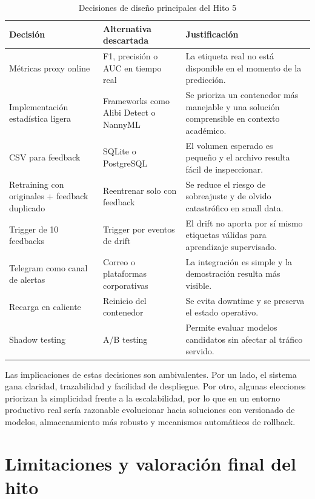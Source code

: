 \begin{table}[h]
\centering
\caption{Decisiones de diseño principales del Hito 5}
\vspace{0.2cm}

\renewcommand{\arraystretch}{1.25}

\begin{tabular}{p{3.5cm} p{4cm} p{6.2cm}}
\hline
\textbf{Decisión} & \textbf{Alternativa descartada} & \textbf{Justificación} \\
\hline
Métricas proxy online & F1, precisión o AUC en tiempo real & La etiqueta real no está disponible en el momento de la predicción. \\
Implementación estadística ligera & Frameworks como Alibi Detect o NannyML & Se prioriza un contenedor más manejable y una solución comprensible en contexto académico. \\
CSV para feedback & SQLite o PostgreSQL & El volumen esperado es pequeño y el archivo resulta fácil de inspeccionar. \\
Retraining con originales + feedback duplicado & Reentrenar solo con feedback & Se reduce el riesgo de sobreajuste y de olvido catastrófico en small data. \\
Trigger de 10 feedbacks & Trigger por eventos de drift & El drift no aporta por sí mismo etiquetas válidas para aprendizaje supervisado. \\
Telegram como canal de alertas & Correo o plataformas corporativas & La integración es simple y la demostración resulta más visible. \\
Recarga en caliente & Reinicio del contenedor & Se evita downtime y se preserva el estado operativo. \\
Shadow testing & A/B testing & Permite evaluar modelos candidatos sin afectar al tráfico servido. \\
\hline
\end{tabular}

\renewcommand{\arraystretch}{1}

\label{tab:decisiones_hito5}
\end{table}
Las implicaciones de estas decisiones son ambivalentes. Por un lado, el sistema gana claridad, trazabilidad y facilidad de despliegue. Por otro, algunas elecciones priorizan la simplicidad frente a la escalabilidad, por lo que en un entorno productivo real sería razonable evolucionar hacia soluciones con versionado de modelos, almacenamiento más robusto y mecanismos automáticos de rollback.

\section{Limitaciones y valoración final del hito}

